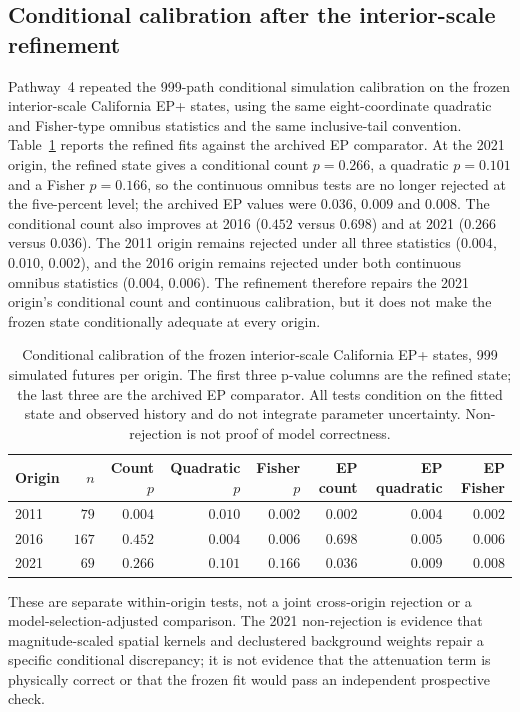 \subsection{Conditional calibration after the interior-scale refinement}\label{sec:s05-pathway4}

Pathway~4 repeated the 999-path conditional simulation calibration on the frozen interior-scale California EP+ states, using the same eight-coordinate quadratic and Fisher-type omnibus statistics and the same inclusive-tail convention. Table~\ref{tab:s05-pathway4} reports the refined fits against the archived EP comparator. At the 2021 origin, the refined state gives a conditional count $p=0.266$, a quadratic $p=0.101$ and a Fisher $p=0.166$, so the continuous omnibus tests are no longer rejected at the five-percent level; the archived EP values were $0.036$, $0.009$ and $0.008$. The conditional count also improves at 2016 ($0.452$ versus $0.698$) and at 2021 ($0.266$ versus $0.036$). The 2011 origin remains rejected under all three statistics ($0.004$, $0.010$, $0.002$), and the 2016 origin remains rejected under both continuous omnibus statistics ($0.004$, $0.006$). The refinement therefore repairs the 2021 origin's conditional count and continuous calibration, but it does not make the frozen state conditionally adequate at every origin.

\begin{table}[htbp]\centering\small
\begin{tabular}{@{}lrrrrrrr@{}}\toprule
Origin & $n$ & Count $p$ & Quadratic $p$ & Fisher $p$ & EP count & EP quadratic & EP Fisher\\\midrule
2011 & $79$ & $0.004$ & $0.010$ & $0.002$ & $0.002$ & $0.004$ & $0.002$\\
2016 & $167$ & $0.452$ & $0.004$ & $0.006$ & $0.698$ & $0.005$ & $0.006$\\
2021 & $69$ & $0.266$ & $0.101$ & $0.166$ & $0.036$ & $0.009$ & $0.008$\\
\bottomrule\end{tabular}
\caption{Conditional calibration of the frozen interior-scale California EP+ states, 999 simulated futures per origin. The first three p-value columns are the refined state; the last three are the archived EP comparator. All tests condition on the fitted state and observed history and do not integrate parameter uncertainty. Non-rejection is not proof of model correctness.}
\label{tab:s05-pathway4}
\end{table}

These are separate within-origin tests, not a joint cross-origin rejection or a model-selection-adjusted comparison. The 2021 non-rejection is evidence that magnitude-scaled spatial kernels and declustered background weights repair a specific conditional discrepancy; it is not evidence that the attenuation term is physically correct or that the frozen fit would pass an independent prospective check.
